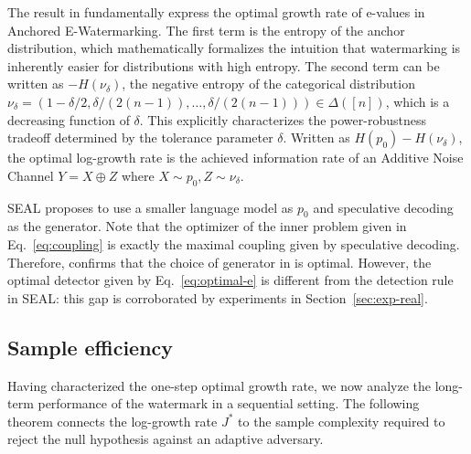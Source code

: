 The result in  fundamentally express the optimal growth rate of e-values in Anchored E-Watermarking. The first term is the entropy of the anchor distribution, which mathematically formalizes the intuition that watermarking is inherently easier for distributions with high entropy. 
The second term can be written as $-H(\nu_\delta)$, the negative entropy of the categorical distribution $\nu_\delta = (1-\delta/2, \delta/(2(n-1)),\dots,\delta/(2(n-1))) \in \Delta([n])$, which is a decreasing function of $\delta$. This explicitly characterizes the power-robustness tradeoff determined by the tolerance parameter $\delta$. 
Written as $H(p_0) - H(\nu_\delta)$, the optimal log-growth rate is the achieved information rate of an Additive Noise Channel $Y = X \oplus Z$ where $X \sim p_0, Z \sim \nu_\delta$. 

\begin{remark}
SEAL proposes to use a smaller language model as $p_0$ and speculative decoding as the generator.
Note that the optimizer of the inner problem given in Eq.~\eqref{eq:coupling} is exactly the maximal coupling given by speculative decoding. Therefore,  confirms that the choice of generator in \citet{huang2025watermarking} is optimal. However, the optimal detector given by Eq.~\eqref{eq:optimal-e} is different from the detection rule in SEAL: this gap is corroborated by experiments in Section~\ref{sec:exp-real}.
\end{remark}

\subsection{Sample efficiency}

Having characterized the one-step optimal growth rate, we now analyze the long-term performance of the watermark in a sequential setting. The following theorem connects the log-growth rate $J^*$ to the sample complexity required to reject the null hypothesis against an adaptive adversary.

